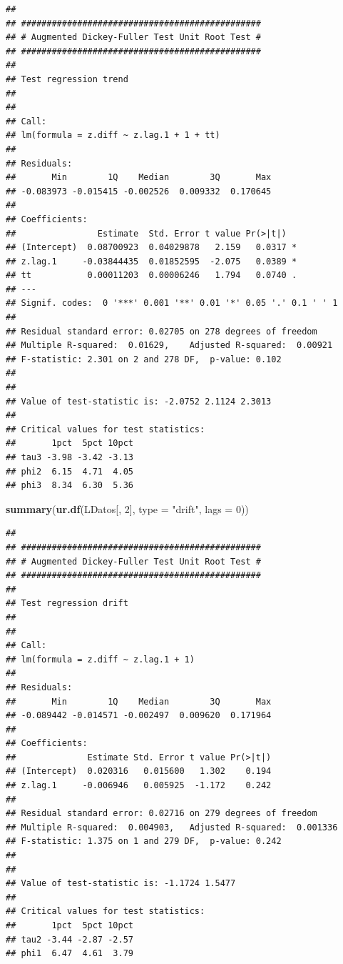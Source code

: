 \documentclass[
]{book}
\newenvironment{Shaded}{\begin{snugshade}}{\end{snugshade}}
\newcommand{\AttributeTok}[1]{\textcolor[rgb]{0.13,0.29,0.53}{#1}}
\newcommand{\DecValTok}[1]{\textcolor[rgb]{0.00,0.00,0.81}{#1}}
\newcommand{\FunctionTok}[1]{\textcolor[rgb]{0.13,0.29,0.53}{\textbf{#1}}}
\newcommand{\NormalTok}[1]{#1}
\newcommand{\StringTok}[1]{\textcolor[rgb]{0.31,0.60,0.02}{#1}}
\begin{document}
\begin{verbatim}
## 
## ############################################### 
## # Augmented Dickey-Fuller Test Unit Root Test # 
## ############################################### 
## 
## Test regression trend 
## 
## 
## Call:
## lm(formula = z.diff ~ z.lag.1 + 1 + tt)
## 
## Residuals:
##       Min        1Q    Median        3Q       Max 
## -0.083973 -0.015415 -0.002526  0.009332  0.170645 
## 
## Coefficients:
##                Estimate  Std. Error t value Pr(>|t|)  
## (Intercept)  0.08700923  0.04029878   2.159   0.0317 *
## z.lag.1     -0.03844435  0.01852595  -2.075   0.0389 *
## tt           0.00011203  0.00006246   1.794   0.0740 .
## ---
## Signif. codes:  0 '***' 0.001 '**' 0.01 '*' 0.05 '.' 0.1 ' ' 1
## 
## Residual standard error: 0.02705 on 278 degrees of freedom
## Multiple R-squared:  0.01629,    Adjusted R-squared:  0.00921 
## F-statistic: 2.301 on 2 and 278 DF,  p-value: 0.102
## 
## 
## Value of test-statistic is: -2.0752 2.1124 2.3013 
## 
## Critical values for test statistics: 
##       1pct  5pct 10pct
## tau3 -3.98 -3.42 -3.13
## phi2  6.15  4.71  4.05
## phi3  8.34  6.30  5.36
\end{verbatim}

\begin{Shaded}
\begin{Highlighting}[]
\FunctionTok{summary}\NormalTok{(}\FunctionTok{ur.df}\NormalTok{(LDatos[, }\DecValTok{2}\NormalTok{], }\AttributeTok{type =} \StringTok{"drift"}\NormalTok{, }\AttributeTok{lags =} \DecValTok{0}\NormalTok{))}
\end{Highlighting}
\end{Shaded}

\begin{verbatim}
## 
## ############################################### 
## # Augmented Dickey-Fuller Test Unit Root Test # 
## ############################################### 
## 
## Test regression drift 
## 
## 
## Call:
## lm(formula = z.diff ~ z.lag.1 + 1)
## 
## Residuals:
##       Min        1Q    Median        3Q       Max 
## -0.089442 -0.014571 -0.002497  0.009620  0.171964 
## 
## Coefficients:
##              Estimate Std. Error t value Pr(>|t|)
## (Intercept)  0.020316   0.015600   1.302    0.194
## z.lag.1     -0.006946   0.005925  -1.172    0.242
## 
## Residual standard error: 0.02716 on 279 degrees of freedom
## Multiple R-squared:  0.004903,   Adjusted R-squared:  0.001336 
## F-statistic: 1.375 on 1 and 279 DF,  p-value: 0.242
## 
## 
## Value of test-statistic is: -1.1724 1.5477 
## 
## Critical values for test statistics: 
##       1pct  5pct 10pct
## tau2 -3.44 -2.87 -2.57
## phi1  6.47  4.61  3.79
\end{verbatim}
\end{document}
